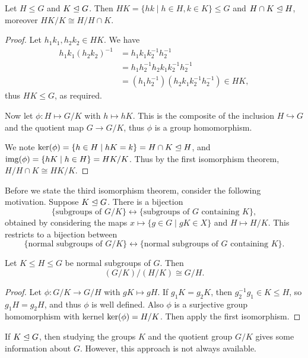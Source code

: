 \documentclass[a4paper]{scrreprt}
\begin{document}
\begin{corollary}
	Let $H \leq G$ and $K \trianglelefteq G$. Then $HK = \{hk \mid h \in H, k \in K \} \leq G$ and $H \cap K \trianglelefteq H$, moreover $HK/K \cong H/H \cap K$.
\end{corollary}
\begin{proof}
	Let $h_1 k_1, h_2 k_2 \in HK$. We have
	\begin{align*}
		h_1 k_1 (h_2 k_2)^{-1} &= h_1 k_1 k_2^{-1} h_2^{-1} \\&= h_1 h_2^{-1} h_2 k_1 k_2^{-1} h_2^{-1} \\&= (h_1 h_2^{-1}) (h_2 k_1 k_2^{-1} h_2^{-1}) \in HK,
	\end{align*}
	thus $HK \leq G$, as required.

	Now let $\phi:H \mapsto G/K$ with $h \mapsto hK$. This is the composite of the inclusion $H \hookrightarrow G$ and the quotient map $G \rightarrow G/K$, thus $\phi$ is a group homomorphism.

	We note $\operatorname{ker}(\phi) = \{h \in H \mid hK = k\} = H \cap K \trianglelefteq H$, and $\operatorname{img}(\phi) =\{hK \mid h \in H \} = HK / K$. Thus by the first isomorphism theorem,
	$
	H/H \cap K \cong HK/K.
	$
\end{proof}

Before we state the third isomorphism theorem, consider the following motivation. Suppose $K \trianglelefteq G$. There is a bijection
$$
\{\text{subgroups of } G/K \} \longleftrightarrow \{ \text{subgroups of } G \text{ containing }K \},
$$
obtained by considering the maps $x \mapsto \{g \in G \mid gK \in X \}$ and $H \mapsto H/K$. This restricts to a bijection between 
$$
\{\text{normal subgroups of }G/K \} \longleftrightarrow \{\text{normal subgroups of }G\text{ containing }K\}.
$$

\begin{corollary}
	Let $K \leq H \leq G$ be normal subgroups of $G$. Then
	$$
	(G/K) / (H/K) \cong G/H.
	$$
\end{corollary}
\begin{proof}
	Let $\phi: G/K \rightarrow G/H$ with $gK \mapsto gH$. If $g_1K = g_2 K$, then $g_2^{-1}g_1 \in K \leq H$, so $g_1 H = g_2 H$, and thus $\phi$ is well defined. Also $\phi$ is a surjective group homomorphism with kernel $\operatorname{ker}(\phi) = H/K$. Then apply the first isomorphism.
\end{proof}


If $K \trianglelefteq G$, then studying the groups $K$ and the quotient group $G/K$ gives some information about $G$. However, this approach is not always available.
\end{document}
